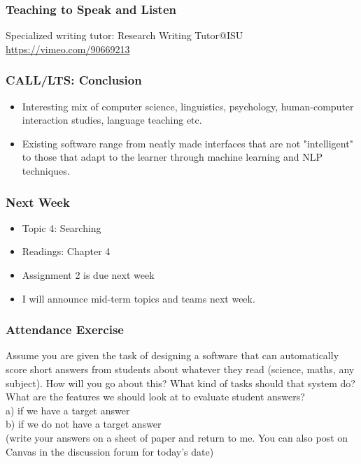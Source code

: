 \documentclass{beamer}
\begin{document}
\begin{frame}
\frametitle{Teaching to Speak and Listen}
Specialized writing tutor: Research Writing Tutor@ISU \\ 
\url{https://vimeo.com/90669213}
\end{frame}

\begin{frame}
\frametitle{CALL/LTS: Conclusion}
\begin{itemize}
\item Interesting mix of computer science, linguistics, psychology, human-computer interaction studies, language teaching etc.
\item Existing software range from neatly made interfaces that are not "intelligent" to those that adapt to the learner through machine learning and NLP techniques.
\end{itemize}
\end{frame}

\begin{frame}
\frametitle{Next Week}
\begin{itemize}
\item Topic 4: Searching
\item Readings: Chapter 4
\item Assignment 2 is due next week
\item I will announce mid-term topics and teams next week. 
\end{itemize}
\end{frame}

\begin{frame}
\frametitle{Attendance Exercise}
Assume you are given the task of designing a software that can automatically score short answers from students about whatever they read (science, maths, any subject). 
How will you go about this? What kind of tasks should that system do? What are the features we should look at to evaluate student answers? \\
a) if we have a target answer \\
b) if we do not have a target answer
\\ \medskip (write your answers on a sheet of paper and return to me. You can also post on Canvas in the discussion forum for today's date)
\end{frame}
\end{document}
